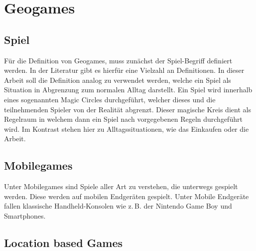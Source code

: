 \section{Geogames}
\label{ch3:s:Geogames}

\subsection*{Spiel}

Für die Definition von Geogames, muss zunächst der Spiel-Begriff definiert werden. In der Literatur gibt es hierfür eine Vielzahl an Definitionen.
In dieser Arbeit soll die Definition analog zu \textcite{Salen.2010} verwendet werden, welche ein Spiel als Situation in Abgrenzung zum normalen Alltag darstellt. Ein Spiel wird innerhalb eines sogenannten Magic Circles durchgeführt, welcher dieses und die teilnehmenden Spieler von der Realität abgrenzt.
Dieser magische Kreis dient als Regelraum in welchem dann ein Spiel nach vorgegebenen Regeln durchgeführt wird. Im Kontrast stehen hier zu Alltagssituationen, wie das Einkaufen oder die Arbeit.


\subsection*{Mobilegames}

Unter Mobilegames sind Spiele aller Art zu verstehen, die unterwegs gespielt werden. Diese werden auf mobilen Endgeräten gespielt.\cite{Bell.2006} Unter Mobile Endgeräte fallen klassische Handheld-Konsolen wie z.\,B. der Nintendo Game Boy und Smartphones.

\subsection*{Location based Games}

